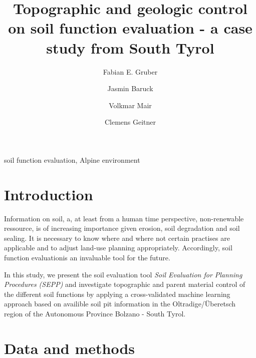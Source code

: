 \documentclass[preprint,12pt,authoryear]{elsarticle}
\begin{document}
\begin{frontmatter}

\title{Topographic and geologic control on soil function evaluation -  a case study from South Tyrol}



\author[mymainadress]{Fabian E. Gruber}
\author[mymainadress]{Jasmin Baruck}
\author[secondadress]{Volkmar Mair}
\author[mymainadress]{Clemens Geitner}



\address[mymainadress]{Institute of Geography, University of Innsbruck, Innrain 52f, 6020 Innsbruck, Austria}
\address[secondadress]{ Amt f\"ur Geologie und Baustoffpr\"ufung, Eggentaler Stra{\ss}e 48, 39053 Kardaun, Autonomous Province Bolzano -- South Tyrol, Italy}
\begin{abstract}

\end{abstract}

\begin{keyword}
soil function evaluation, Alpine environment
\end{keyword}

\end{frontmatter}

\linenumbers

\section{Introduction}
Information on soil, a, at least from a human time perspective, non-renewable ressource, is of increasing importance given erosion, soil degradation and soil sealing. It is necessary to know where and where not certain practises are applicable and to adjust land-use planning appropriately. Accordingly, soil function evaluationis an invaluable tool for the future.

In this study, we present the soil evaluation tool \emph{Soil Evaluation for Planning Procedures (SEPP)} and investigate topographic and parent material control of the different soil functions by applying a cross-validated machine learning approach based on availible soil pit information in the Oltradige/\"{U}beretsch region of the Autonomous Province Bolzano - South Tyrol.

\citep{Haslmayr2016}
\section{Data and methods}
\end{document}
